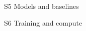 \begin{frame}{S5 Models and baselines}
\end{frame}

\begin{frame}{S6 Training and compute}
\end{frame}

